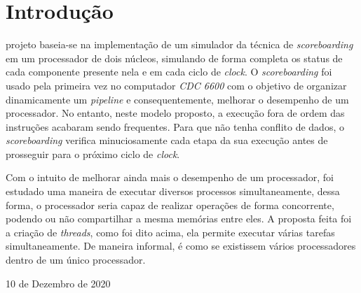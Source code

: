 \documentclass[journal]{IEEEtran}
\begin{document}
\section{Introdução}
% 
% 
% 
% 
 projeto baseia-se na implementação de um simulador da técnica de \textit{scoreboarding} em um processador de dois núcleos, simulando de forma completa os status de cada componente presente nela e em cada ciclo de \textit{clock}. O \textit{scoreboarding} foi usado pela primeira vez no computador \textit{CDC 6600} com o objetivo de organizar dinamicamente um \textit{pipeline} e consequentemente, melhorar o desempenho de um processador. No entanto, neste modelo proposto, a execução fora de ordem das instruções acabaram sendo frequentes. Para que não tenha conflito de dados, o \textit{scoreboarding} verifica minuciosamente cada etapa da sua execução antes de prosseguir para o próximo ciclo de \textit{clock}.

Com o intuito de melhorar ainda mais o desempenho de um processador, foi estudado uma maneira de executar diversos processos simultaneamente, dessa forma, o processador seria capaz de realizar operações de forma concorrente, podendo ou não compartilhar a mesma memórias entre eles. A proposta feita foi a criação de \textit{threads}, como foi dito acima, ela permite executar várias tarefas simultaneamente. De maneira informal, é como se existissem vários processadores dentro de um único processador. 
 
\hfill 10 de Dezembro de 2020

%
%
\end{document}
